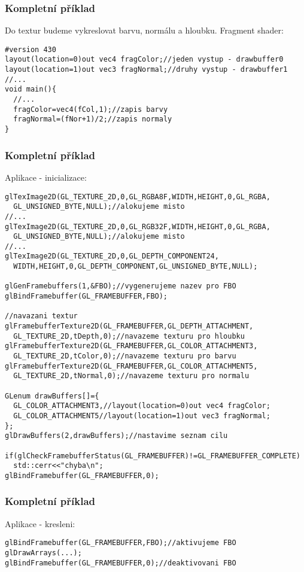 \begin{frame}[fragile]
\frametitle{Kompletní příklad}
    Do textur budeme vykreslovat barvu, normálu a hloubku.
    Fragment shader:
    {\scriptsize
    \begin{verbatim}
#version 430
layout(location=0)out vec4 fragColor;//jeden vystup - drawbuffer0
layout(location=1)out vec3 fragNormal;//druhy vystup - drawbuffer1
//...
void main(){
  //...
  fragColor=vec4(fCol,1);//zapis barvy
  fragNormal=(fNor+1)/2;//zapis normaly
}
    \end{verbatim}
    }
\end{frame}

\begin{frame}[fragile]
\frametitle{Kompletní příklad}
    Aplikace - inicializace:
    {\tiny
    \begin{verbatim}
glTexImage2D(GL_TEXTURE_2D,0,GL_RGBA8F,WIDTH,HEIGHT,0,GL_RGBA,
  GL_UNSIGNED_BYTE,NULL);//alokujeme misto
//...
glTexImage2D(GL_TEXTURE_2D,0,GL_RGB32F,WIDTH,HEIGHT,0,GL_RGBA,
  GL_UNSIGNED_BYTE,NULL);//alokujeme misto
//...
glTexImage2D(GL_TEXTURE_2D,0,GL_DEPTH_COMPONENT24,
  WIDTH,HEIGHT,0,GL_DEPTH_COMPONENT,GL_UNSIGNED_BYTE,NULL);

glGenFramebuffers(1,&FBO);//vygenerujeme nazev pro FBO
glBindFramebuffer(GL_FRAMEBUFFER,FBO);

//navazani textur
glFramebufferTexture2D(GL_FRAMEBUFFER,GL_DEPTH_ATTACHMENT,
  GL_TEXTURE_2D,tDepth,0);//navazeme texturu pro hloubku
glFramebufferTexture2D(GL_FRAMEBUFFER,GL_COLOR_ATTACHMENT3,
  GL_TEXTURE_2D,tColor,0);//navazeme texturu pro barvu
glFramebufferTexture2D(GL_FRAMEBUFFER,GL_COLOR_ATTACHMENT5,
  GL_TEXTURE_2D,tNormal,0);//navazeme texturu pro normalu

GLenum drawBuffers[]={
  GL_COLOR_ATTACHMENT3,//layout(location=0)out vec4 fragColor;
  GL_COLOR_ATTACHMENT5//layout(location=1)out vec3 fragNormal;
};
glDrawBuffers(2,drawBuffers);//nastavime seznam cilu

if(glCheckFramebufferStatus(GL_FRAMEBUFFER)!=GL_FRAMEBUFFER_COMPLETE)
  std::cerr<<"chyba\n";
glBindFramebuffer(GL_FRAMEBUFFER,0);
    \end{verbatim}
    }
\end{frame}

\begin{frame}[fragile]
\frametitle{Kompletní příklad}
    Aplikace - kresleni:
    {\scriptsize
    \begin{verbatim}
glBindFramebuffer(GL_FRAMEBUFFER,FBO);//aktivujeme FBO
glDrawArrays(...);
glBindFramebuffer(GL_FRAMEBUFFER,0);//deaktivovani FBO
    \end{verbatim}
    }
\end{frame}

